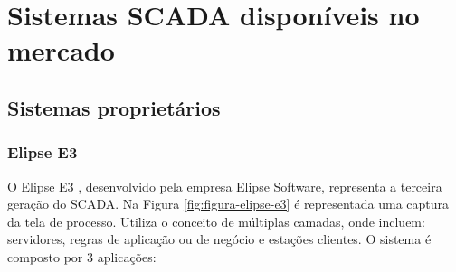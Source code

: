     \begin{figure}[!h]
{}	
\end{figure}

\section{Sistemas SCADA disponíveis no mercado}
\label{sec:sistemas-scada}

\subsection{Sistemas proprietários}
\label{sec:sistemas-scada-proprietarios}

\subsubsection{Elipse E3}
\label{sec:elipse}

    O Elipse E3 \cite{Elipse}, desenvolvido pela empresa Elipse Software, representa a terceira geração do \gls{SCADA}. Na Figura \ref{fig:figura-elipse-e3} é representada uma captura da tela de processo. Utiliza o conceito de múltiplas camadas, onde incluem: servidores, regras de aplicação ou de negócio e estações clientes. O sistema é composto por 3 aplicações: 
    
